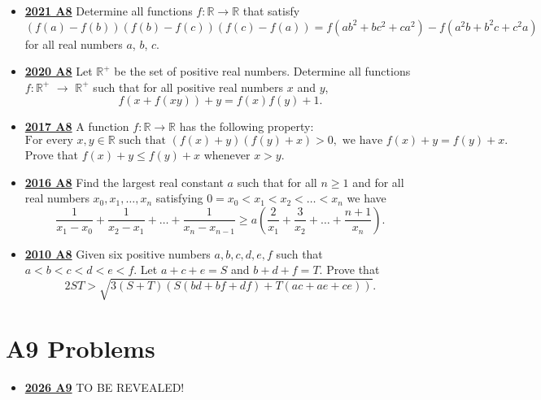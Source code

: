 \documentclass[11pt]{scrartcl}
\begin{document}
\begin{itemize}[leftmargin=*]
    Prove that there exist positive real numbers $c_1$, $c_2$, and $\lambda$ such that\[c_1\lambda^n<f(n)<c_2\lambda^n\]for all positive integers $n$.
    
\item \href{https://artofproblemsolving.com/community/c6h2882529p25627449}{\textbf{2021 A8}} Determine all functions $f: \mathbb{R} \rightarrow \mathbb{R}$ that satisfy$$(f(a)-f(b))(f(b)-f(c))(f(c)-f(a)) = f(ab^2+bc^2+ca^2) - f(a^2b+b^2c+c^2a)$$for all real numbers $a$, $b$, $c$.

\item \href{https://artofproblemsolving.com/community/c6h2625874p22698175}{\textbf{2020 A8}} Let $\mathbb{R}^+$ be the set of positive real numbers. Determine all functions $f:\mathbb{R}^+$ $\rightarrow$ $\mathbb{R}^+$ such that for all positive real numbers $x$ and $y$,
$$f(x+f(xy))+y=f(x)f(y)+1.$$

\item \href{https://artofproblemsolving.com/community/c6h1671299p10632376}{\textbf{2017 A8}} A function $f:\mathbb{R} \to \mathbb{R}$ has the following property:
$$\text{For every } x,y \in \mathbb{R} \text{ such that }(f(x)+y)(f(y)+x) > 0, \text{ we have } f(x)+y = f(y)+x.$$Prove that $f(x)+y \leqslant f(y)+x$ whenever $x>y$.

\item \href{https://artofproblemsolving.com/community/c6h1480693p8639259}{\textbf{2016 A8}} 	Find the largest real constant $a$ such that for all $n \geqslant  1$ and for all real numbers $x_0, x_1, \dots , x_n$ satisfying $0 = x_0 < x_1 < x_2 < \dots < x_n$ we have
\[\frac{1}{x_1-x_0} + \frac{1}{x_2-x_1} + \dots + \frac{1}{x_n-x_{n-1}} \geqslant  a \left( \frac{2}{x_1} + \frac{3}{x_2} + \dots + \frac{n+1}{x_n} \right).\]

\item \href{https://artofproblemsolving.com/community/c6h418684p2362291}{\textbf{2010 A8}} Given six positive numbers $a,b,c,d,e,f$ such that $a < b < c < d < e < f.$ Let $a+c+e=S$ and $b+d+f=T.$ Prove that
\[2ST > \sqrt{3(S+T)\left(S(bd + bf + df) + T(ac + ae + ce) \right)}.\]
\end{itemize}

\newpage

\section*{A9 Problems} \label{A9}
\begin{itemize}[leftmargin=*]
    \item \href{https://www.imo-official.org/assets/documents/problems/2026/IMO2026SL.pdf}{\textbf{2026 A9}} TO BE REVEALED!
\end{itemize}
\end{document}
